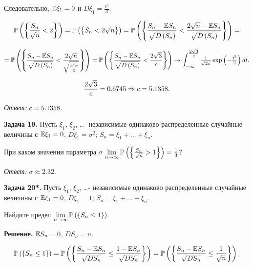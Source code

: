 Следовательно, ${\rm {\mathbb E}}\xi _{1} =0$ и $D\xi _{1} =\frac{c^{2} }{3} $.

\[{\rm {\mathbb P}}\left(\left\{\frac{S_{n} }{\sqrt{n} } <2\right\}\right)={\rm {\mathbb P}}\left(\left\{S_{n} <2\sqrt{n} \right\}\right)={\rm {\mathbb P}}\left(\left\{\frac{S_{n} -{\rm {\mathbb E}}S_{n} }{\sqrt{D\left(S_{n} \right)} } <\frac{2\sqrt{n} -{\rm {\mathbb E}}S_{n} }{\sqrt{D\left(S_{n} \right)} } \right\}\right)=\] 

\[={\rm {\mathbb P}}\left(\left\{\frac{S_{n} -{\rm {\mathbb E}}S_{n} }{\sqrt{D\left(S_{n} \right)} } <\frac{2\sqrt{n} }{\sqrt{{\tfrac{c^{2} n}{3}} } } \right\}\right)={\rm {\mathbb P}}\left(\left\{\frac{S_{n} -{\rm {\mathbb E}}S_{n} }{\sqrt{D\left(S_{n} \right)} } <\frac{2\sqrt{3} }{c} \right\}\right)\to \int _{-\infty }^{{\tfrac{2\sqrt{3} }{c}} }{\tfrac{1}{\sqrt{2\pi } }} \exp \left(-{\tfrac{t^{2} }{2}} \right)dt .\] 

\[\frac{2\sqrt{3} }{c} ={\rm 0.6745}\Rightarrow c={\rm 5.1358}.\] 

\textit{Ответ:} $c={\rm 5.1358}$.



\textbf{Задача 19. }Пусть $\xi _{1} $, $\xi _{2} $, \dots  - независимые одинаково распределенные случайные величины с ${\rm {\mathbb E}}\xi _{1} =0$, $D\xi _{1} =\sigma ^{2} $; $S_{n} =\xi _{1} +...+\xi _{n} $.  

При каком значении параметра $\sigma $ $\mathop{\lim }\limits_{n\to \infty } {\rm {\mathbb P}}\left(\left\{\frac{S_{n} }{\sqrt{n} } >1\right\}\right)=\frac{1}{3} $?

\textit{Ответ:} $\sigma \approx 2.32$.

 

\textbf{Задача 20*. }Пусть $\xi _{1} $, $\xi _{2} $, \dots  - независимые одинаково распределенные случайные величины с ${\rm {\mathbb E}}\xi _{1} =0$, $D\xi _{1} =1$; $S_{n} =\xi _{1} +...+\xi _{n} $.  

Найдите предел $\mathop{\lim }\limits_{n\to \infty } {\rm {\mathbb P}}\left(\left\{S_{n} \le 1\right\}\right)$.

\textbf{Решение. }${\rm {\mathbb E}}S_{n} =0$, $DS_{n} =n$. 

\[{\rm {\mathbb P}}\left(\left\{S_{n} \le 1\right\}\right)={\rm {\mathbb P}}\left(\left\{\frac{S_{n} -{\rm {\mathbb E}}S_{n} }{\sqrt{DS_{n} } } \le \frac{1-{\rm {\mathbb E}}S_{n} }{\sqrt{DS_{n} } } \right\}\right)={\rm {\mathbb P}}\left(\left\{\frac{S_{n} -{\rm {\mathbb E}}S_{n} }{\sqrt{DS_{n} } } \le \frac{1}{\sqrt{n} } \right\}\right).\] 

